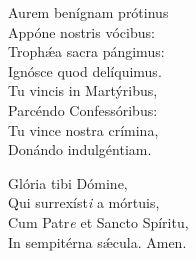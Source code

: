 Aurem benígnam prótinus\\
Appóne nostris vócibus:\\
Trophǽa sacra pángimus:\\
Ignósce quod delíquimus.\\

Tu vincis in Martýribus,\\
Parcéndo Confessóribus:\\
Tu vince nostra crímina,\\
Donándo indulgéntiam.

Glória tibi Dómine,\\
Qui surrexíst\textit{i} a mórtuis,\\
Cum Patr\textit{e} et Sancto Spíritu,\\
In sempitérna sǽcula.
Amen.